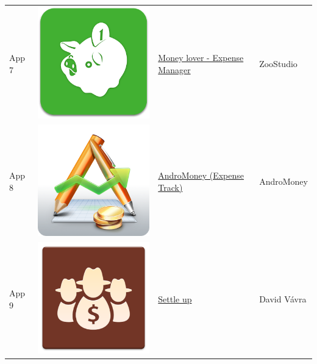 \begin{tabular}{ | l | c | l | l | }
App 7 & \includegraphics[scale=0.05]{A07_icon.png} & \href{https://play.google.com/store/apps/details?id=com.bookmark.money}{Money lover - Expense Manager} & ZooStudio   \\

App 8 & \includegraphics[scale=0.05]{A08_icon.png} & \href{https://play.google.com/store/apps/details?id=com.kpmoney.android}{AndroMoney (Expense Track)} & AndroMoney \\

App 9 & \includegraphics[scale=0.05]{A10_icon.png} & \href{https://play.google.com/store/apps/details?id=cz.destil.settleup}{Settle up} & David Vávra \\


\end{tabular}
